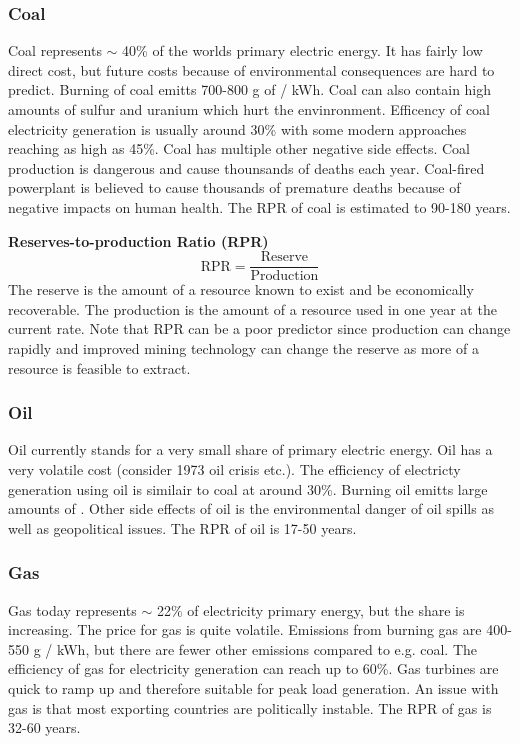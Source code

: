 \subsubsection{Coal}
Coal represents $\sim$ 40\% of the worlds primary electric energy.
It has fairly low direct cost, but future costs because of environmental consequences are hard to predict.
Burning of coal emitts 700-800 g of \cotwo / kWh. Coal can also contain high amounts of sulfur and uranium which hurt the envinronment. Efficency of coal electricity generation is usually around 30\% with some modern approaches reaching as high as 45\%.
Coal has multiple other negative side effects.
Coal production is dangerous and cause thounsands of deaths each year.
Coal-fired powerplant is believed to cause thousands of premature deaths because of negative impacts on human health.
The RPR of coal is estimated to 90-180 years.

\begin{tcolorbox}
    \textbf{Reserves-to-production Ratio (RPR)}\\
    $$
    \text{RPR} = \frac{\text{Reserve}}{\text{Production}}
    $$
    The reserve is the amount of a resource known to exist and be economically recoverable.
    The production is the amount of a resource used in one year at the current rate.
    Note that RPR can be a poor predictor since production can change rapidly and improved mining technology can change the reserve as more of a resource is feasible to extract.
\end{tcolorbox}

\subsubsection{Oil}
Oil currently stands for a very small share of primary electric energy.
Oil has a very volatile cost (consider 1973 oil crisis etc.).
The efficiency of electricty generation using oil is similair to coal at around 30\%.
Burning oil emitts large amounts of \cotwo.
Other side effects of oil is the environmental danger of oil spills as well as geopolitical issues.
The RPR of oil is 17-50 years.

\subsubsection{Gas}
Gas today represents $\sim$ 22\% of electricity primary energy, but the share is increasing.
The price for gas is quite volatile.
Emissions from burning gas are 400-550 g \cotwo / kWh, but there are fewer other emissions compared to e.g. coal.
The efficiency of gas for electricity generation can reach up to 60\%.
Gas turbines are quick to ramp up and therefore suitable for peak load generation.
An issue with gas is that most exporting countries are politically instable.
The RPR of gas is 32-60 years.

